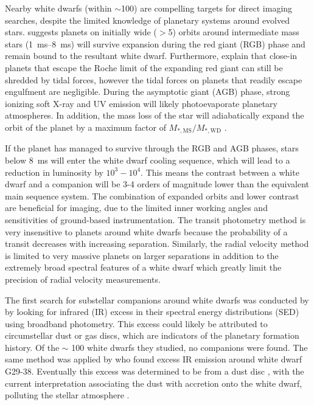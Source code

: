 \documentclass[twocolumn]{aastex631}
\begin{document}
Nearby white dwarfs (within $\sim$\qty{100}{\parsec}) are compelling targets for direct imaging searches, despite the limited knowledge of planetary systems around evolved stars. \cite{burleigh_imaging_2002} suggests planets on initially wide ($>$\qty{5}{\au}) orbits around intermediate mass stars (\qtyrange{1}{8}{\ms}) will survive expansion during the red giant (RGB) phase and remain bound to the resultant white dwarf. Furthermore, \citet{nordhaus_orbits_2013} explain that close-in planets that escape the Roche limit of the expanding red giant can still be shredded by tidal forces, however the tidal forces on planets that readily escape engulfment are negligible. During the asymptotic giant (AGB) phase, strong ionizing soft X-ray and UV emission will likely photoevaporate planetary atmospheres. In addition, the mass loss of the star will adiabatically expand the orbit of the planet by a maximum factor of $M_{*,\mathrm{MS}}/M_{*,\mathrm{WD}}$ \citep{jeans_cosmogonic_1924}.

If the planet has managed to survive through the RGB and AGB phases, stars below \qty{8}{\ms} will enter the white dwarf cooling sequence, which will lead to a reduction in luminosity by $10^3-10^4$. This means the contrast between a white dwarf and a companion will be 3-4 orders of magnitude lower than the equivalent main sequence system. The combination of expanded orbits and lower contrast are beneficial for imaging, due to the limited inner working angles and sensitivities of ground-based instrumentation. The transit photometry method is very insensitive to planets around white dwarfs because the probability of a transit decreases with increasing separation. Similarly, the radial velocity method is limited to very massive planets on larger separations in addition to the extremely broad spectral features of a white dwarf which greatly limit the precision of radial velocity measurements.

The first search for substellar companions around white dwarfs was conducted by \citet{probst_infrared_1983} by looking for infrared (IR) excess in their spectral energy distributions (SED) using broadband photometry. This excess could likely be attributed to circumstellar dust or gas discs, which are indicators of the planetary formation history. Of the $\sim$ 100 white dwarfs they studied, no companions were found. The same method was applied by \citet{zuckerman_excess_1987} who found excess IR emission around white dwarf G29-38. Eventually this excess was determined to be from a dust disc \citep{telesco_observations_1990}, with the current interpretation associating the dust with accretion onto the white dwarf, polluting the stellar atmosphere \citep{koester_metals_1997}.
\end{document}
